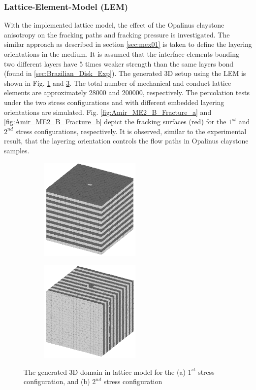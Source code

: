 \subsubsection*{Lattice-Element-Model (LEM)}

With the implemented lattice model, the effect of the Opalinus claystone anisotropy on the fracking paths and fracking pressure is investigated. The similar approach as described in section \ref {sec:mex01} is taken to define the layering orientations in the medium. It is assumed that the interface elements bonding two different layers have 5 times weaker strength than the same layers bond (found in \ref{sec:Brazilian_Disk_Exp}). The generated 3D setup using the LEM is shown in Fig. \ref{fig:Amir_Percolation_Setup_a} and \ref{fig:Amir_Percolation_Setup_b}. The total number of mechanical and conduct lattice elements are approximately 28000 and 200000, respectively.
The percolation tests under the two stress configurations and with different embedded layering orientations are simulated. Fig. \ref{fig:Amir_ME2_B_Fracture_a} and \ref{fig:Amir_ME2_B_Fracture_b} depict the fracking surfaces (red) for the $1^{st}$ and $2^{nd}$ stress configurations, respectively. It is observed, similar to the experimental result, that the layering orientation controls the flow paths in Opalinus claystone samples. 

\begin{figure}[!ht]
\begin{subfigure}[c]{0.48\textwidth}
\centering
\includegraphics[width=5cm,height=5cm]{figures/Amir_Percolation_Setup_a.png}
\subcaption{}
\label{fig:Amir_Percolation_Setup_a}
\end{subfigure}
\hfill
\begin{subfigure}[c]{0.48\textwidth}
\centering
\includegraphics[width=5cm,height=5cm]{figures/Amir_Percolation_Setup_b.png}
\subcaption{}
\label{fig:Amir_Percolation_Setup_b}
\end{subfigure}
\caption{The generated 3D domain in lattice model for the (a) $1^{st}$ stress configuration, and (b) $2^{nd}$ stress configuration}
\end{figure}

